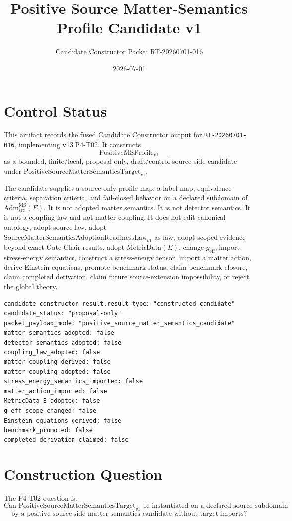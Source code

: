 \documentclass[11pt]{article}
\title{Positive Source Matter-Semantics Profile Candidate v1}
\author{Candidate Constructor Packet RT-20260701-016}
\date{2026-07-01}
\newcommand{\SMSAR}{\mathrm{SourceMatterSemanticsAdoptionReadinessLaw}_{v1}}
\newcommand{\PMSTarget}{\mathrm{PositiveSourceMatterSemanticsTarget}_{v1}}
\newcommand{\PMSProf}{\mathrm{PositiveMSProfile}_{v1}}
\newcommand{\AdmSrc}{\mathrm{Adm}^{\mathrm{MS}}_{\mathrm{src}}}
\newcommand{\MetricData}{\mathrm{MetricData}}
\newcommand{\geff}{g_{\mathrm{eff}}}
\begin{document}
\maketitle

\section{Control Status}

This artifact records the fused Candidate Constructor output for
\texttt{RT-20260701-016}, implementing v13 P4-T02. It constructs
\[
  \PMSProf
\]
as a bounded, finite/local, proposal-only, draft/control source-side candidate
under \(\PMSTarget\).

The candidate supplies a source-only profile map, a label map, equivalence
criteria, separation criteria, and fail-closed behavior on a declared subdomain
of \(\AdmSrc(E)\). It is not adopted matter semantics. It is not detector
semantics. It is not a coupling law and not matter coupling. It does not edit
canonical ontology, adopt source law, adopt \(\SMSAR\) as law, adopt scoped
evidence beyond exact Gate Chair results, adopt \(\MetricData(E)\), change
\(\geff\), import stress-energy semantics, construct a stress-energy tensor,
import a matter action, derive Einstein equations, promote benchmark status,
claim benchmark closure, claim completed derivation, claim future
source-extension impossibility, or reject the global theory.

\begin{verbatim}
candidate_constructor_result.result_type: "constructed_candidate"
candidate_status: "proposal-only"
packet_payload_mode: "positive_source_matter_semantics_candidate"
matter_semantics_adopted: false
detector_semantics_adopted: false
coupling_law_adopted: false
matter_coupling_derived: false
matter_coupling_adopted: false
stress_energy_semantics_imported: false
matter_action_imported: false
MetricData_E_adopted: false
g_eff_scope_changed: false
Einstein_equations_derived: false
benchmark_promoted: false
completed_derivation_claimed: false
\end{verbatim}

\section{Construction Question}

The P4-T02 question is:
\[
\text{Can \(\PMSTarget\) be instantiated on a declared source subdomain}
\]
\[
\text{by a positive source-side matter-semantics candidate without target
imports?}
\]
\end{document}
